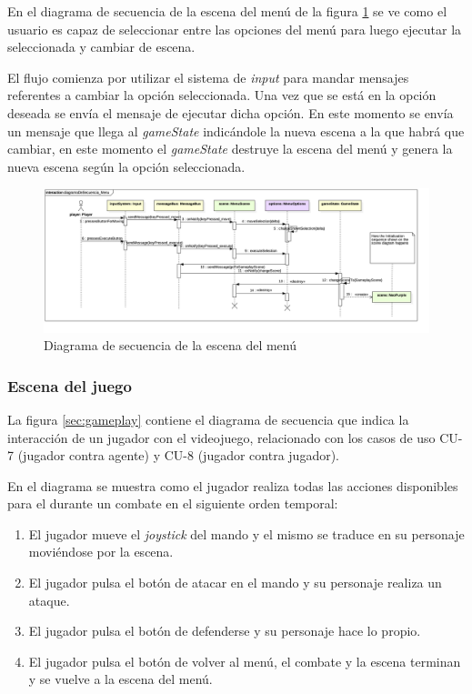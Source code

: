 En el diagrama de secuencia de la escena del menú de la figura \ref{sec:menu} se ve como el usuario es capaz de seleccionar entre las opciones del menú para luego ejecutar la seleccionada y cambiar de escena.

\bigskip

El flujo comienza por utilizar el sistema de \textit{input} para mandar mensajes referentes a cambiar la opción seleccionada. Una vez que se está en la opción deseada se envía el mensaje de ejecutar dicha opción. En este momento se envía un mensaje que llega al \textit{gameState} indicándole la nueva escena a la que habrá que cambiar, en este momento el \textit{gameState} destruye la escena del menú y genera la nueva escena según la opción seleccionada.

\begin{landscape}
\begin{figure}
	\hspace*{-3cm}  
	\includegraphics[width=24cm]{otros/UML/png/alld/png/CasosDeUso__Especifico__Collaboration1__Interaction1__diagramaDeSecuencia_Menu_17.png}
	\caption{Diagrama de secuencia de la escena del menú}
	\label{sec:menu}
\end{figure}
\end{landscape}

\subsubsection*{Escena del juego}

La figura \ref{sec:gameplay} contiene el diagrama de secuencia que indica la interacción de un jugador con el videojuego, relacionado con los casos de uso CU-7 (jugador contra agente) y CU-8 (jugador contra jugador).

\bigskip

En el diagrama se muestra como el jugador realiza todas las acciones disponibles para el durante un combate en el siguiente orden temporal:

\begin{enumerate}
	\item El jugador mueve el \textit{joystick} del mando y el mismo se traduce en su personaje moviéndose por la escena.
	\item El jugador pulsa el botón de atacar en el mando y su personaje realiza un ataque.
	\item El jugador pulsa el botón de defenderse y su personaje hace lo propio.
	\item El jugador pulsa el botón de volver al menú, el combate y la escena terminan y se vuelve a la escena del menú.
\end{enumerate}

